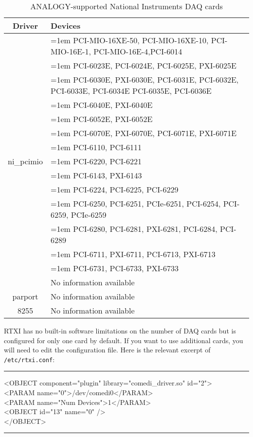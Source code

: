 \begin{fullpage}
\begin{table}
\caption{ANALOGY-supported National Instruments DAQ cards}
\label{ANALOGY NI}
\begin{center}
\vspace{.5cm}
\begin{tabular}{ |c|p{11cm}| }
 \hline
 \textbf{Driver} & \textbf{Devices}\\ \hline
 \multirow{15}{*}{ni\_pcimio} & \hangindent=1em PCI-MIO-16XE-50, PCI-MIO-16XE-10, PCI-MIO-16E-1, PCI-MIO-16E-4,PCI-6014 \\
& \hangindent=1em PCI-6023E, PCI-6024E, PCI-6025E, PXI-6025E \\
& \hangindent=1em PCI-6030E, PXI-6030E, PCI-6031E, PCI-6032E, PCI-6033E, PCI-6034E PCI-6035E,  PCI-6036E \\
& \hangindent=1em PCI-6040E, PXI-6040E \\
& \hangindent=1em PCI-6052E, PXI-6052E \\
& \hangindent=1em PCI-6070E, PXI-6070E, PCI-6071E, PXI-6071E \\
& \hangindent=1em PCI-6110, PCI-6111 \\
& \hangindent=1em PCI-6220, PCI-6221 \\
& \hangindent=1em PCI-6143, PXI-6143 \\
& \hangindent=1em PCI-6224, PCI-6225, PCI-6229 \\
& \hangindent=1em PCI-6250, PCI-6251, PCIe-6251, PCI-6254, PCI-6259, PCIe-6259 \\
& \hangindent=1em PCI-6280, PCI-6281, PXI-6281, PCI-6284, PCI-6289 \\
& \hangindent=1em PCI-6711, PXI-6711, PCI-6713, PXI-6713 \\
& \hangindent=1em PCI-6731, PCI-6733, PXI-6733 \\ \hline
 s526 & No information available \\ \hline
 parport & No information available \\ \hline
 8255 & No information available \\
 \hline
\end{tabular}
\end{center}
\end{table}
\end{fullpage}

\label{more DAQ cards}\attention RTXI has no built-in software limitations on the number of DAQ cards but is configured for only one card by default. If you want to use additional cards, you will need to edit the configuration file. Here is the relevant excerpt of \texttt{/etc/rtxi.conf}:
\begin{example}
\bigskip\hrule\smallskip
<OBJECT component="plugin" library="comedi\_driver.so" id="2">\\
<PARAM name="0">/dev/comedi0</PARAM>\\
<PARAM name="Num Devices">1</PARAM>\\
<OBJECT id="13" name="0" />\\
</OBJECT>
\bigskip\hrule\bigskip
\end{example}

